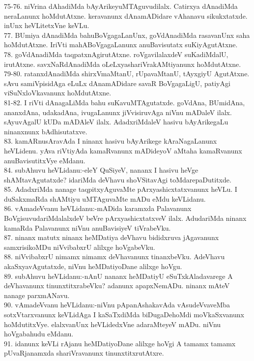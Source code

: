 \documentclass{article}
\begin{document}
75-76. niVrina dAhadiMda bAyArikeyuMTAguvudilalx. Catirxya dAnadiMda neraLanunx hoMdutAtxne. keravanunx dAnamADidare vAhanavu sikukxtatxde. inUnx heVLitetxVne keVLu.\\
77. BUmiya dAnadiMda bahuBoVgagaLanUnx, goVdAnadiMda rasavanUnx saha hoMdutAtxne. IriVti mahABoVgagaLanunx anuBavisutatx suKiyAgutAtxne.\\
78. goVdAnadiMda taqpatxnAgirutAtxne. roVgavilalaxdeV suKadiMdalU, irutAtxne. savxNaRdAnadiMda oLeLxyashariVrakAMtiyanunx hoMdutAtxne.\\
79-80. ratanxdAnadiMda shirxVmaMtanU, rUpavaMtanU, tAyxgiyU AgutAtxne. sAvu samiVpisidAga eLuLx dAnamADidare savaR BoVgagaLigU, patiyAgi viSuNxloVkavanunx hoMdutAtxne.\\
81-82. I riVti dAnagaLiMda bahu suKavuMTAgutatxde. goVdAna, BUmidAna, ananxdAna, udakadAna, ivugaLanunx jiVvisiruvAga niVnu mADaleV ilalx. sAyuvAgalU kUDa mADAleV ilalx. AdadxriMdaleV hasivu bAyArikegaLu ninanxnunx bAdhisutatxve.\\
83. kamARnusAravAda I ninanx hasivu bAyArikege kAraNagaLanunx heVLidenu. yAva riVtiyAda kamaRvanunx mADideyoV aMtaha kamaRvanunx anuBavisutitxVye eMdanu.\\
84. subAhuvu heVLidanu:-eleY QuSiyeV, nananx I hasivu heVge shAMtavAgutatxde? idariMda deVhavu shoVSitavAgi toMdarepaDutitxde.\\
85. AdadxriMda nanage taqpitxyAguvaMte pArxyashicxtatxvanunx heVLu. I duSakxmaRda shAMtiyu uMTAguvaMte mADu eMdu keVLidanu.\\
86. vAmadeVvanu heVLidanu:-mADida karamxda Palavanunx BoVgisuvudariMdalalxdeV beVre pArxyashicxtatxveV ilalx. AdudariMda ninanx kamaRda Palavanunx niVnu anuBavisiyeV tiVrabeVku.\\
87. ninanx matutx ninanx heMDatiya deVhavu bididxruva jAgavanunx samxrisikoMDu niVvibabxrU alilxge hoVgabeVku.\\
88. niVvibabxrU nimamx nimamx deVhavanunx tinanxbeVku. AdeVhavu akaSxyavAgutatxde, niVnu heMDatiyoDane alilxge hoVgu.\\
89. subAhuvu heVLidanu:-nAnU nananx heMDatiyU eSuTxkAladavarege A deVhavanunx tinunxtitxrabeVku? adanunx apapxNemADu. ninanx mAteV nanage parxmANavu.\\
90. vAmadeVvanu heVLidanu:-niVnu pApanAshakavAda vAsudeVvaveMba sotxVtarxvanunx keVLidAga I kaSaTxdiMda biDugaDehoMdi moVkaSxvanunx hoMdutitxVye. elalxvanUnx heVLidedxVne adaraMteyeV mADu. niVnu hoVgabahudu eMdanu.\\
91. idanunx keVLi rAjanu heMDatiyoDane alilxge hoVgi A tamamx tamamx pUvaRjanamxda shariVravanunx tinunxtitxrutAtxre.\\
\end{document}
